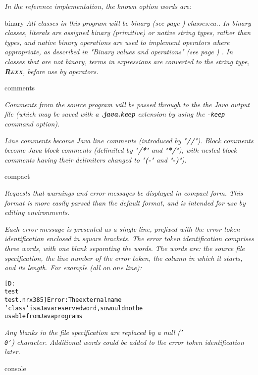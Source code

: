 \emph{In the reference implementation, the known option words are:}
\begin{description}
\item{binary}
\emph{All classes in this program will be  binary (see page \pageref{refbincla}) 
classes:ea..
In binary classes, literals are assigned binary (primitive) or native
string types, rather than \nr{} types, and native binary operations
are used to implement operators where appropriate, as described in
 "\emph{Binary values and operations}" (see page \pageref{refbinary}) .
In classes that are not binary, terms in expressions are converted to
the \nr{} string type, \textbf{R\textsc{exx}}, before use by operators.}
\item{comments}

\emph{Comments from the \nr{} source program will be passed through to the
the Java output file (which may be saved with a \textbf{.java.keep}
extension by using the \texttt{-keep} command option).}
 
\emph{Line comments become Java line comments (introduced by
"\textbf{//}").
Block comments become Java block comments (delimited by
"\textbf{/*}" and "\textbf{*/}"), with nested block
comments having their delimiters changed to "\textbf{(-}" and
"\textbf{-)}").}
\item{compact}

\emph{Requests that warnings and error messages be displayed in compact
form.  This format is more easily parsed than the default format, and
is intended for use by editing environments.}
 
\emph{Each error message is presented as a single line, prefixed with the
error token identification enclosed in square brackets.
The error token identification comprises three words, with one blank
separating the words.  The words are: the source file specification, the
line number of the error token, the column in which it starts, and its
length.  For example (all on one line):}
\begin{alltt}
[D:\\test\\test.nrx 3 8 5] Error: The external name
'class' is a Java reserved word, so would not be
usable from Java programs
\end{alltt}
\emph{Any blanks in the file specification are replaced by a null
(\texttt{'\\0'}) character.  Additional words could be added to the error
token identification later.}
\item{console}


\end{description}
